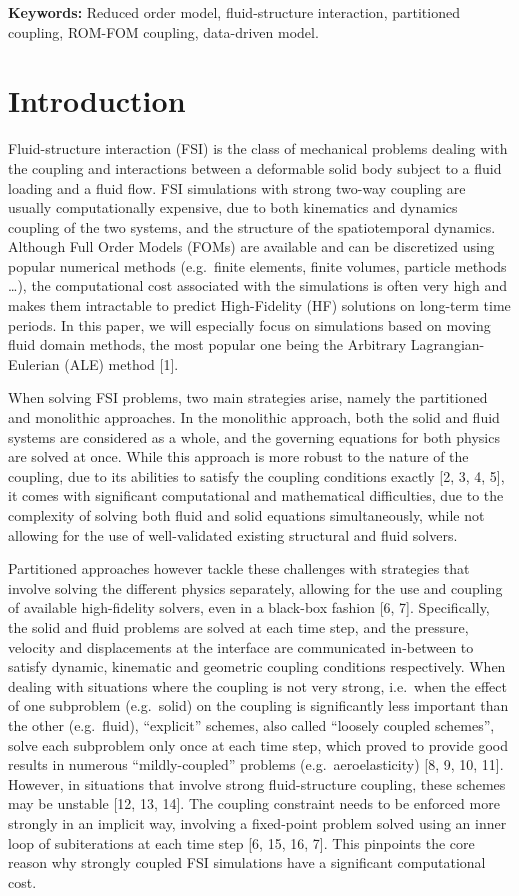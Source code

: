 \documentclass[11pt]{article}
\begin{document}
\noindent\textbf{Keywords:} Reduced order model, fluid-structure interaction, partitioned coupling, ROM-FOM coupling, data-driven model.

\section{Introduction}

Fluid-structure interaction (FSI) is the class of mechanical problems dealing with the coupling and interactions between a deformable solid body subject to a fluid loading and a fluid flow. FSI simulations with strong two-way coupling are usually computationally expensive, due to both kinematics and dynamics coupling of the two systems, and the structure of the spatiotemporal dynamics. Although Full Order Models (FOMs) are available and can be discretized using popular numerical methods (e.g.\ finite elements, finite volumes, particle methods \dots), the computational cost associated with the simulations is often very high and makes them intractable to predict High-Fidelity (HF) solutions on long-term time periods. In this paper, we will especially focus on simulations based on moving fluid domain methods, the most popular one being the Arbitrary Lagrangian-Eulerian (ALE) method [1].

When solving FSI problems, two main strategies arise, namely the partitioned and monolithic approaches. In the monolithic approach, both the solid and fluid systems are considered as a whole, and the governing equations for both physics are solved at once. While this approach is more robust to the nature of the coupling, due to its abilities to satisfy the coupling conditions exactly [2, 3, 4, 5], it comes with significant computational and mathematical difficulties, due to the complexity of solving both fluid and solid equations simultaneously, while not allowing for the use of well-validated existing structural and fluid solvers.

Partitioned approaches however tackle these challenges with strategies that involve solving the different physics separately, allowing for the use and coupling of available high-fidelity solvers, even in a black-box fashion [6, 7]. Specifically, the solid and fluid problems are solved at each time step, and the pressure, velocity and displacements at the interface are communicated in-between to satisfy dynamic, kinematic and geometric coupling conditions respectively. When dealing with situations where the coupling is not very strong, i.e.\ when the effect of one subproblem (e.g.\ solid) on the coupling is significantly less important than the other (e.g.\ fluid), ``explicit'' schemes, also called ``loosely coupled schemes'', solve each subproblem only once at each time step, which proved to provide good results in numerous ``mildly-coupled'' problems (e.g.\ aeroelasticity) [8, 9, 10, 11]. However, in situations that involve strong fluid-structure coupling, these schemes may be unstable [12, 13, 14]. The coupling constraint needs to be enforced more strongly in an implicit way, involving a fixed-point problem solved using an inner loop of subiterations at each time step [6, 15, 16, 7]. This pinpoints the core reason why strongly coupled FSI simulations have a significant computational cost.
\end{document}
